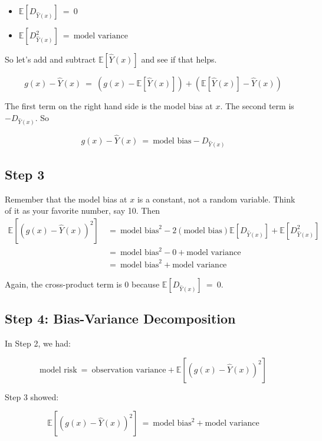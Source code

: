 \documentclass[
  letterpaper,
  DIV=11,
  numbers=noendperiod]{scrreprt}
\providecommand{\tightlist}{%
  \setlength{\itemsep}{0pt}\setlength{\parskip}{0pt}}\usepackage{longtable,booktabs,array}
\begin{document}
\begin{tcolorbox}[enhanced jigsaw, breakable, arc=.35mm, leftrule=.75mm, left=2mm, colframe=quarto-callout-color-frame, rightrule=.15mm, bottomrule=.15mm, toprule=.15mm, opacityback=0, colback=white]
\begin{itemize}
\tightlist
\item
  \(\mathbb{E}\left[D_{\hat{Y}(x)}\right] ~ = ~ 0\)
\item
  \(\mathbb{E}\left[D_{\hat{Y}(x)}^2\right] ~ = ~ \text{model variance}\)
\end{itemize}

So let's add and subtract \(\mathbb{E}\left[\hat{Y}(x)\right]\) and see
if that helps.

\[
g(x) - \hat{Y}(x) ~ = ~ \left(g(x) - \mathbb{E}\left[\hat{Y}(x)\right] \right) + \left(\mathbb{E}\left[\hat{Y}(x)\right] - \hat{Y}(x)\right) 
\]

The first term on the right hand side is the model bias at \(x\). The
second term is \(-D_{\hat{Y}(x)}\). So

\[
g(x) - \hat{Y}(x) ~ = ~ \text{model bias} - D_{\hat{Y}(x)}
\]

\subsection{Step 3}\label{step-3}

Remember that the model bias at \(x\) is a constant, not a random
variable. Think of it as your favorite number, say 10. Then \[
\begin{align*}
\mathbb{E}\left[ \left(g(x) - \hat{Y}(x)\right)^2 \right] ~ &= ~ \text{model bias}^2 - 2(\text{model bias})\mathbb{E}\left[D_{\hat{Y}(x)}\right] + \mathbb{E}\left[D_{\hat{Y}(x)}^2\right] \\
&= ~ \text{model bias}^2 - 0 + \text{model variance} \\
&= ~ \text{model bias}^2 + \text{model variance}
\end{align*}
\]

Again, the cross-product term is \(0\) because
\(\mathbb{E}\left[D_{\hat{Y}(x)}\right] ~ = ~ 0\).

\subsection{Step 4: Bias-Variance
Decomposition}\label{step-4-bias-variance-decomposition}

In Step 2, we had:

\[
\text{model risk} ~ = ~ \text{observation variance} + \mathbb{E}\left[\left(g(x) - \hat{Y}(x)\right)^2\right]
\]

Step 3 showed:

\[
\mathbb{E}\left[ \left(g(x) - \hat{Y}(x)\right)^2 \right] ~ = ~ \text{model bias}^2 + \text{model variance}
\]


\end{tcolorbox}
\end{document}
